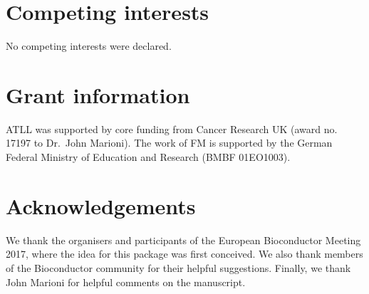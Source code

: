 \documentclass[10pt,a4paper,twocolumn]{article}
\begin{document}
\section*{Competing interests}
No competing interests were declared.

\section*{Grant information}
ATLL was supported by core funding from Cancer Research UK (award no. 17197 to Dr.\ John Marioni).
The work of FM is supported by the German Federal Ministry of Education and Research (BMBF 01EO1003).

\section*{Acknowledgements}
We thank the organisers and participants of the European Bioconductor Meeting 2017, where the idea for this package was first conceived.
We also thank members of the Bioconductor community for their helpful suggestions.
Finally, we thank John Marioni for helpful comments on the manuscript.
% 
% 

{\small
}

\bigskip





\end{document}
